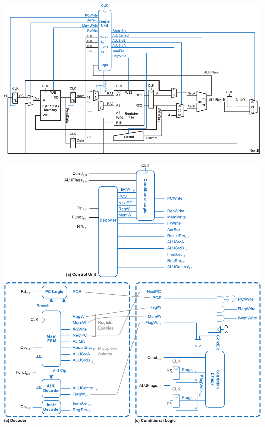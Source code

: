 \documentclass{e85}
\begin{document}
\begin{enumerate}
  \begin{solution}
    \begin{center}
      \includegraphics[width=\linewidth]
      {figures/2-register/ddca-multicycle-datapath.pdf}

      \includegraphics[width=\linewidth]
      {figures/2-register/ddca-multicycle-control-unit.pdf}


\end{center}
\end{solution}
\end{enumerate}
\end{document}

